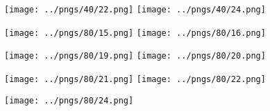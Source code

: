 \documentclass[12pt, a4paper]{article}
\begin{document}
\begin{figure}
\centering
\texttt{[image: ../pngs/40/22.png]} 
\texttt{[image: ../pngs/40/24.png]} 
\end{figure}

\begin{figure}
\centering
\texttt{[image: ../pngs/80/15.png]} 
\texttt{[image: ../pngs/80/16.png]} 
\end{figure}

\begin{figure}
\centering
\texttt{[image: ../pngs/80/19.png]} 
\texttt{[image: ../pngs/80/20.png]} 
\end{figure}

\begin{figure}
\centering
\texttt{[image: ../pngs/80/21.png]} 
\texttt{[image: ../pngs/80/22.png]} 
\end{figure}

\begin{figure}
\centering
\texttt{[image: ../pngs/80/24.png]} 
\end{figure}



\end{document}
